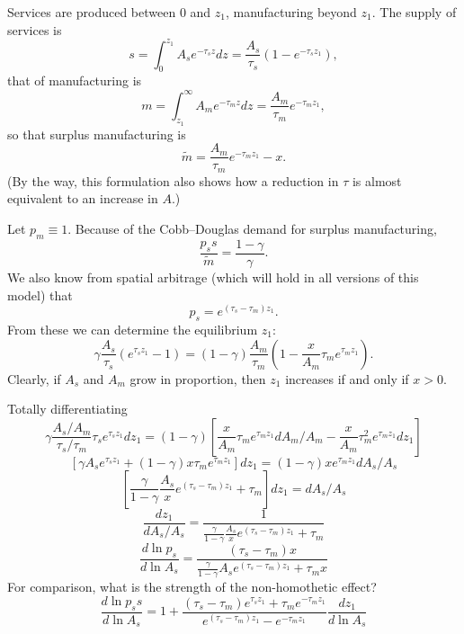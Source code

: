 \documentclass[letter]{amsart}
\theoremstyle{definition}
\theoremstyle{remark}
\numberwithin{equation}{section}
\begin{document}
Services are produced between 0 and $z_1$, manufacturing beyond $z_1$. The supply of services is 
\[
s = \int_{0}^{z_1}A_s e^{-\tau_s z} dz = \frac{A_s}{\tau_s}\left(1-e^{-\tau_s z_1}\right),
\]
that of manufacturing is
\[
m = \int_{z_1}^\infty A_m e^{-\tau_m z} dz = \frac{A_m}{\tau_m}e^{-\tau_m z_1},
\]
so that surplus manufacturing is
\[
\tilde m = \frac{A_m}{\tau_m}e^{-\tau_m z_1} - x.
\]
(By the way, this formulation also shows how a reduction in $\tau$ is almost equivalent to an increase in $A$.)

Let $p_m\equiv 1$. Because of the Cobb--Douglas demand for surplus manufacturing,
\[
\frac{p_s s}{\tilde m} = \frac{1-\gamma}{\gamma}.
\]
We also know from spatial arbitrage (which will hold in all versions of this model) that
\[
p_s = e^{(\tau_s-\tau_m)z_1}.
\]
From these we can determine the equilibrium $z_1$:
\begin{equation}\label{eq:equ}
    \gamma \frac{A_s}{\tau_s}\left(e^{\tau_s z_1}-1\right) = 
    (1-\gamma) \frac{A_m}{\tau_m}\left(1-\frac{x}{A_m}\tau_me^{\tau_m z_1}\right).
\end{equation}
Clearly, if $A_s$ and $A_m$ grow in proportion, then $z_1$ increases if and only if $x>0$. 

Totally differentiating
\[
\gamma \frac{A_s/A_m}{\tau_s/\tau_m}\tau_s e^{\tau_s z_1} dz_1 = 
(1-\gamma) \left[\frac{x}{A_m}\tau_me^{\tau_m z_1}dA_m/A_m-\frac{x}{A_m}\tau_m^2e^{\tau_m z_1}dz_1\right]
\]
\[
\left[\gamma {A_s}e^{\tau_s z_1}+(1-\gamma)x\tau_me^{\tau_m z_1}\right]  dz_1 = 
(1-\gamma) {x}e^{\tau_m z_1}dA_s/A_s
\]
\[
\left[\frac{\gamma}{1-\gamma} \frac{A_s}{x}e^{(\tau_s-\tau_m) z_1}+\tau_m\right]  dz_1 = 
dA_s/A_s
\]
\[
\frac{dz_1}{dA_s/A_s} = \frac{1}{\frac{\gamma}{1-\gamma} \frac{A_s}{x}e^{(\tau_s-\tau_m) z_1}+\tau_m}
\]
\[
\frac{d\ln p_s}{d\ln A_s} = \frac{(\tau_s-\tau_m)x}{\frac{\gamma}{1-\gamma} {A_s}e^{(\tau_s-\tau_m) z_1}+\tau_m x}
\]
For comparison, what is the strength of the non-homothetic effect? 
\[
\frac{d\ln p_ss}{d\ln A_s} = 1 + \frac{(\tau_s-\tau_m)e^{\tau_s z_1} +\tau_m e^{-\tau_m z_1}}{e^{(\tau_s-\tau_m) z_1} - e^{-\tau_m z_1}}\frac{dz_1}{d\ln A_s}
\]
\end{document}
